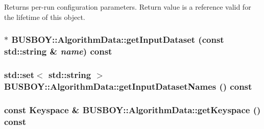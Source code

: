 Returns per-\/run configuration parameters. Return value is a reference valid for the lifetime of this object. \hypertarget{classBUSBOY_1_1AlgorithmData_a43a66590e61d6221cd19f20975129b28}{
\subsubsection[{getInputDataset}]{ $\ast$ BUSBOY::AlgorithmData::getInputDataset (const std::string \& {\em name}) const}}
\label{classBUSBOY_1_1AlgorithmData_a43a66590e61d6221cd19f20975129b28}
\hypertarget{classBUSBOY_1_1AlgorithmData_adaed0664b95cdf0402ed974200e75f17}{
\subsubsection[{getInputDatasetNames}]{\setlength{\rightskip}{0pt plus 5cm}std::set$<$ std::string $>$ BUSBOY::AlgorithmData::getInputDatasetNames () const}}
\label{classBUSBOY_1_1AlgorithmData_adaed0664b95cdf0402ed974200e75f17}
\hypertarget{classBUSBOY_1_1AlgorithmData_add1317dede984946bab40e3fb541deeb}{
\subsubsection[{getKeyspace}]{\setlength{\rightskip}{0pt plus 5cm}const {\bf Keyspace} \& BUSBOY::AlgorithmData::getKeyspace () const}}
\label{classBUSBOY_1_1AlgorithmData_add1317dede984946bab40e3fb541deeb}


